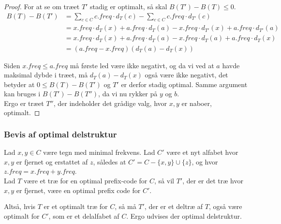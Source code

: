\begin{proof}
For at se om træet $T'$ stadig er optimalt, så skal $B(T') - B(T) \leq 0$.\\
\begin{align*}
B(T) - B(T') &= \sum_{c \in C} c.freq \cdot d_T(c) - \sum_{c \in C} c.freq \cdot d_{T'}(c)\\
            &= x.freq \cdot d_T(x) + a.freq \cdot d_T(a) - x.freq \cdot d_{T'}(x) + a.freq \cdot d_{T'}(a)\\
            &= x.freq \cdot d_T(x) + a.freq \cdot d_T(a) - x.freq \cdot d_{T}(a) + a.freq \cdot d_{T}(x)\\
            &= (a.freq - x.freq)(d_T(a) - d_T(x))
\end{align*}

Siden $x.freq \leq a.freq$ må første led være ikke negativt, og da vi ved at $a$ havde maksimal dybde i træet, må $d_T(a) - d_T(x)$ også være ikke negativt, det betyder at $0 \leq B(T) - B(T')$ og $T'$ er derfor stadig optimal. Samme argument kan bruges i $B(T') - B(T'')$, da vi nu rykker på $y$ og $b$.\\

Ergo er træet $T''$, der indeholder det grådige valg, hvor $x,y$ er naboer, optimalt.
\end{proof}

\subsubsection{Bevis af optimal delstruktur}

\begin{lemma}
Lad $x,y \in C$ være tegn med minimal frekvens. Lad $C'$ være et nyt alfabet hvor $x, y$ er fjernet og erstattet af $z$, således at $C' = C - \{x,y\} \cup \{z\}$, og hvor $z.freq = x.freq + y.freq$.\\ Lad $T$ være et træ for en optimal prefix-code for $C$, så vil $T'$, der er det træ hvor $x,y$ er fjernet, være en optimal prefix code for $C'$.\\
\end{lemma}
Altså, hvis $T$ er et optimalt træ for $C$, så må $T'$, der er et deltræ af $T$, også være optimalt for $C'$, som er et delalfabet af $C$. Ergo udvises der optimal delstruktur.\\

